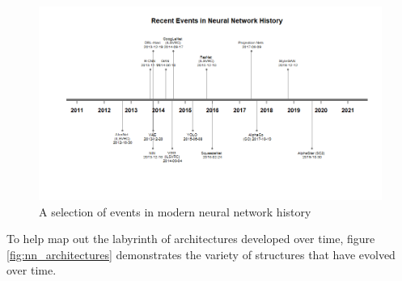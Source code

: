 \begin{figure}
    \centering
    \includegraphics[width=140mm,scale=1.5]{figs/timeline_new_nn.png}
    \caption{A selection of events in modern neural network history}
    \label{fig:timeline_new_nn}
\end{figure}


To help map out the labyrinth of architectures developed over time, figure \ref{fig:nn_architectures} demonstrates the variety of structures that have evolved over time.

